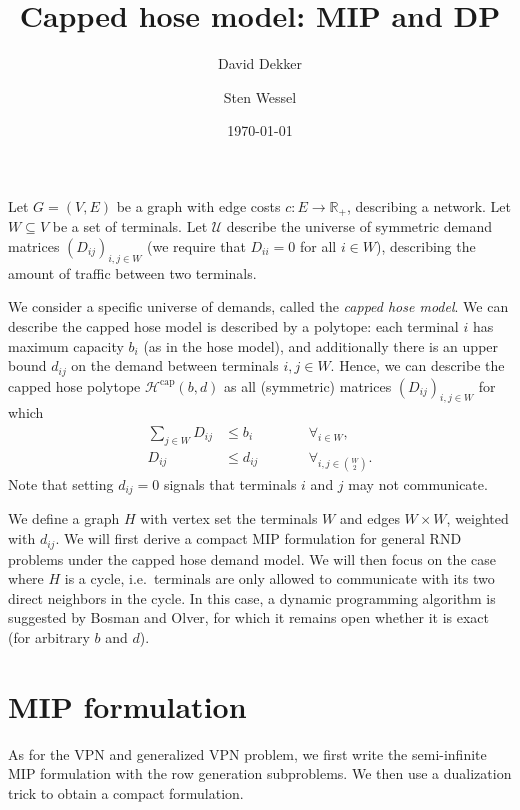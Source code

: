 \documentclass[11pt]{article}
\title{Capped hose model: MIP and DP}
\author{David Dekker \and Sten Wessel}
\date{\today}
\begin{document}
    \maketitle

    Let $G = (V, E)$ be a graph with edge costs $c\colon E \to \mathbb R_+$, describing a network.
    Let $W \subseteq V$ be a set of terminals.
    Let $\mathcal U$ describe the universe of symmetric demand matrices $(D_{ij})_{i,j \in W}$ (we require that $D_{ii} = 0$ for all $i \in W$), describing the amount of traffic between two terminals.

    We consider a specific universe of demands, called the \emph{capped hose model}.
    We can describe the capped hose model is described by a polytope: each terminal $i$ has maximum capacity $b_i$ (as in the hose model), and additionally there is an upper bound $d_{ij}$ on the demand between terminals $i,j \in W$.
    Hence, we can describe the capped hose polytope $\mathcal H^\text{cap}(b, d)$ as all (symmetric) matrices $(D_{ij})_{i,j \in W}$ for which
    \[
        \begin{split}
            \sum_{j \in W} D_{ij} &\le b_i \qquad&&\forall_{i \in W}, \\
            D_{ij} &\le d_{ij} \qquad&&\forall_{i,j \in \binom W 2}.
        \end{split}
    \]
    Note that setting $d_{ij} = 0$ signals that terminals $i$ and $j$ may not communicate.

    We define a graph $H$ with vertex set the terminals $W$ and edges $W \times W$, weighted with $d_{ij}$.
    We will first derive a compact MIP formulation for general RND problems under the capped hose demand model.
    We will then focus on the case where $H$ is a cycle, i.e.\ terminals are only allowed to communicate with its two direct neighbors in the cycle.
    In this case, a dynamic programming algorithm is suggested by Bosman and Olver, for which it remains open whether it is exact (for arbitrary $b$ and $d$).

    \section{MIP formulation}
    As for the VPN and generalized VPN problem, we first write the semi-infinite MIP formulation with the row generation subproblems.
    We then use a dualization trick to obtain a compact formulation.
\end{document}
